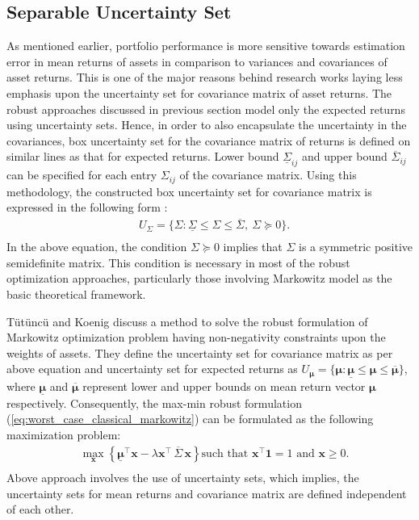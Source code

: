 \subsection{Separable Uncertainty Set} \label{ssec:sep}
As mentioned earlier, portfolio performance is more sensitive towards estimation error in mean returns of assets in comparison to variances and covariances of asset returns. This is one of the major reasons behind research works laying less emphasis upon the uncertainty set for covariance matrix of asset returns. The robust approaches discussed in previous section model only the expected returns using uncertainty sets. Hence, in order to also encapsulate the uncertainty in the covariances, box uncertainty set for the covariance matrix of returns is defined on similar lines as that for expected returns. Lower bound $\underline{\Sigma}_{ij}$ and upper bound $\overline{\Sigma}_{ij}$ can be specified for each entry $\Sigma_{ij}$ of the covariance matrix. Using this methodology, the constructed box uncertainty set for covariance matrix is expressed in the following form \cite{tutuncu} :
\begin{equation}
\begin{split}
& U_{\Sigma}= \{\Sigma: \underline{\Sigma} \leq \Sigma \leq \overline{\Sigma}, \ \Sigma \succeq 0 \}. \\
\end{split}
\end{equation}
In the above equation, the condition $\Sigma \succeq 0$ implies that $\Sigma$ is a symmetric positive semidefinite matrix. This condition is necessary in most of the robust optimization approaches, particularly those involving Markowitz model as the basic theoretical framework. 

Tütüncü and Koenig \cite{tutuncu} discuss a method to solve the robust formulation of Markowitz optimization problem having non-negativity constraints upon the weights of assets. They define the uncertainty set for covariance matrix as per above equation and uncertainty set for expected returns as $U_{\boldsymbol{\mu}}= \{\boldsymbol{\mu}: \underline{\boldsymbol{\mu}} \leq \boldsymbol{\mu} \leq \overline{\boldsymbol{\mu}} \}$, where $\underline{\boldsymbol{\mu}}$ and $\overline{\boldsymbol{\mu}}$ represent lower and upper bounds on mean return vector $\boldsymbol{\mu}$ respectively.
Consequently, the max-min robust formulation (\ref{eq:worst_case_classical_markowitz}) can be formulated as the following maximization problem:
\begin{equation}
\begin{split}
& \max_{\mathbf{x}} \left\{ \underline{\boldsymbol{\mu}}^{\top} \mathbf{x} - \lambda \mathbf{x^{\top}} \, \overline{\Sigma} \, \mathbf{x} \right\} \text{such that } \mathbf{x^{\top}} \mathbf{1}  = 1 \text{ and } \mathbf{x} \geq 0.  \\
\end{split}
\end{equation}
Above approach involves the use of  uncertainty sets, which implies, the uncertainty sets for mean returns and covariance matrix are defined independent of each other.
